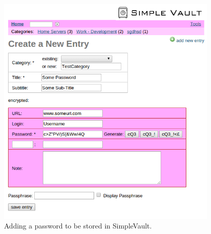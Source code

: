			\begin{figure}[htbp]
				\centering
				\includegraphics[width=0.95\textwidth]{figures/analysis/simplevault_newpassword.png}
				\caption{Adding a password to be stored in SimpleVault.}
				\label{fig:simplevault_addpassword}
			\end{figure}

